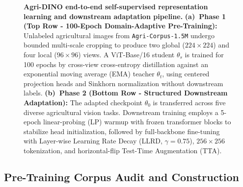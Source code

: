 \documentclass[10pt,twocolumn,letterpaper]{article}
\begin{document}
\begin{figure}[t]
{
}%
\caption{
  \textbf{Agri-DINO end-to-end self-supervised representation learning and downstream adaptation pipeline.}
  \textbf{(a)~Phase 1 (Top Row - 100-Epoch Domain-Adaptive Pre-Training):} Unlabeled agricultural images from \texttt{Agri-Corpus-1.5M} undergo bounded multi-scale cropping to produce two global ($224\times224$) and four local ($96\times96$) views. A ViT-Base/16 student $\theta_s$ is trained for 100 epochs by cross-view cross-entropy distillation against an exponential moving average (EMA) teacher $\theta_t$, using centered projection heads and Sinkhorn normalization without downstream labels.
  \textbf{(b)~Phase 2 (Bottom Row - Structured Downstream Adaptation):} The adapted checkpoint $\theta_0$ is transferred across five diverse agricultural vision tasks. Downstream training employs a 5-epoch linear-probing (LP) warmup with frozen transformer blocks to stabilize head initialization, followed by full-backbone fine-tuning with Layer-wise Learning Rate Decay (LLRD, $\gamma{=}0.75$), $256\times256$ tokenization, and horizontal-flip Test-Time Augmentation (TTA).
}
\label{fig:pipeline}
\vspace{-6pt}
\end{figure}

\subsection{Pre-Training Corpus Audit and Construction}
\label{sec:corpus}
\end{document}

